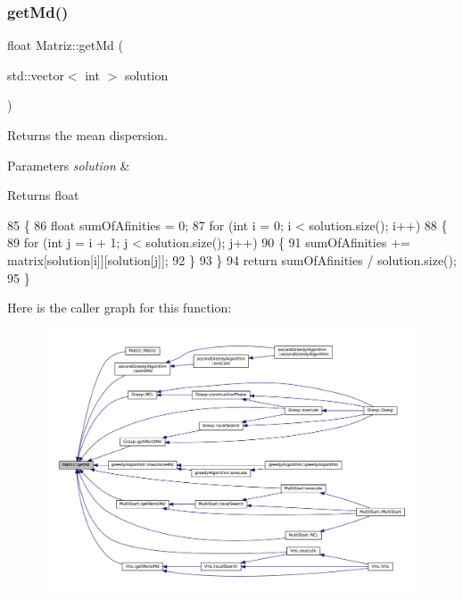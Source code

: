 \subsubsection{\texorpdfstring{get\+Md()}{getMd()}}
{\footnotesize\ttfamily float Matriz\+::get\+Md (\begin{DoxyParamCaption}\item[{std\+::vector$<$ int $>$}]{solution }\end{DoxyParamCaption})}



Returns the mean dispersion. 


\begin{DoxyParams}{Parameters}
{\em solution} & \\
\hline
\end{DoxyParams}
\begin{DoxyReturn}{Returns}
float 
\end{DoxyReturn}

\begin{DoxyCode}
85 \{
86   \textcolor{keywordtype}{float} sumOfAfinities = 0;
87   \textcolor{keywordflow}{for} (\textcolor{keywordtype}{int} i = 0; i < solution.size(); i++)
88   \{
89     \textcolor{keywordflow}{for} (\textcolor{keywordtype}{int} j = i + 1; j < solution.size(); j++)
90     \{
91       sumOfAfinities += matrix[solution[i]][solution[j]];
92     \}
93   \}
94   \textcolor{keywordflow}{return} sumOfAfinities / solution.size();
95 \}
\end{DoxyCode}
Here is the caller graph for this function\+:
\nopagebreak
\begin{figure}[H]
\begin{center}
\leavevmode
\includegraphics[width=350pt]{classMatriz_a8df14a27d791f24206dd633b2a685c5b_icgraph}
\end{center}
\end{figure}
\mbox{\label{classMatriz_a61efbcc7ea661059ed0dfad32b5273cf}} 
